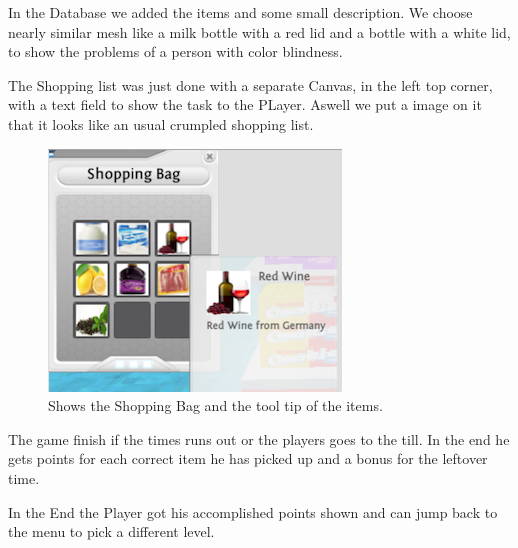 \documentclass{sig-alternate-05-2015}
\begin{document}
In the Database we added the items and some small description. We choose nearly similar mesh like a milk bottle with a red lid and a bottle with a white lid, to show the problems of a person with color blindness.

The Shopping list was just done with a separate Canvas, in the left top corner, with a text field to show the task to the PLayer. Aswell we put a image on it that it looks like an usual crumpled shopping list. 

\begin{figure}
    \centering
    \includegraphics[width=\columnwidth]{ShoppingBag.png}
    \caption{Shows the Shopping Bag and the tool tip of the items.}
    \label{fig:ShoppingBag}
\end{figure}

The game finish if the times runs out or the players goes to the till. In the end he gets points for each correct item he has picked up and a bonus for the leftover time.

In the End the Player got his accomplished points shown and can jump back to the menu to pick a different level. 



\end{document}

